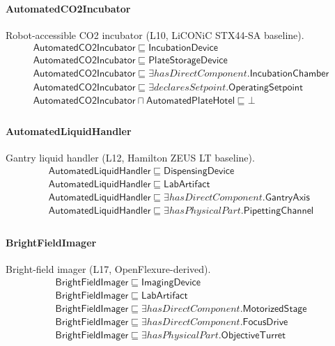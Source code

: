 \documentclass[10pt]{article}
\begin{document}
\paragraph{AutomatedCO2Incubator} Robot-accessible CO2 incubator (L10, LiCONiC STX44-SA baseline).
\[\begin{array}{l}
\mathsf{AutomatedCO2Incubator} \sqsubseteq  \mathsf{IncubationDevice} \\
\mathsf{AutomatedCO2Incubator} \sqsubseteq  \mathsf{PlateStorageDevice} \\
\mathsf{AutomatedCO2Incubator} \sqsubseteq  \exists \mathit{hasDirectComponent}.\mathsf{IncubationChamber} \\
\mathsf{AutomatedCO2Incubator} \sqsubseteq  \exists \mathit{declaresSetpoint}.\mathsf{OperatingSetpoint} \\
\mathsf{AutomatedCO2Incubator} \sqcap  \mathsf{AutomatedPlateHotel} \sqsubseteq  \bot  \\
\end{array}\]
\paragraph{AutomatedLiquidHandler} Gantry liquid handler (L12, Hamilton ZEUS LT baseline).
\[\begin{array}{l}
\mathsf{AutomatedLiquidHandler} \sqsubseteq  \mathsf{DispensingDevice} \\
\mathsf{AutomatedLiquidHandler} \sqsubseteq  \mathsf{LabArtifact} \\
\mathsf{AutomatedLiquidHandler} \sqsubseteq  \exists \mathit{hasDirectComponent}.\mathsf{GantryAxis} \\
\mathsf{AutomatedLiquidHandler} \sqsubseteq  \exists \mathit{hasPhysicalPart}.\mathsf{PipettingChannel} \\
\end{array}\]
\paragraph{BrightFieldImager} Bright-field imager (L17, OpenFlexure-derived).
\[\begin{array}{l}
\mathsf{BrightFieldImager} \sqsubseteq  \mathsf{ImagingDevice} \\
\mathsf{BrightFieldImager} \sqsubseteq  \mathsf{LabArtifact} \\
\mathsf{BrightFieldImager} \sqsubseteq  \exists \mathit{hasDirectComponent}.\mathsf{MotorizedStage} \\
\mathsf{BrightFieldImager} \sqsubseteq  \exists \mathit{hasDirectComponent}.\mathsf{FocusDrive} \\
\mathsf{BrightFieldImager} \sqsubseteq  \exists \mathit{hasPhysicalPart}.\mathsf{ObjectiveTurret} \\
\end{array}\]
\end{document}
